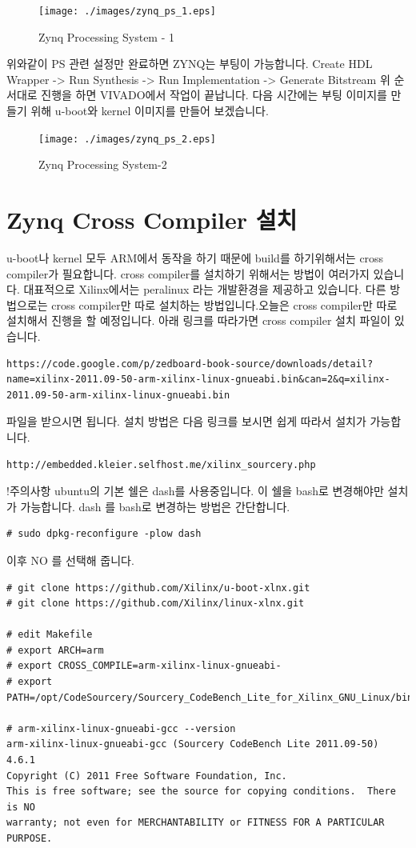 \documentclass[11pt
  , a4paper
  , article
  , oneside
]{memoir}
\begin{document}
\begin{figure}[h!]
	\centering
	\texttt{[image: ./images/zynq\_ps\_1.eps]}
	\caption{Zynq Processing System - 1}
	\label{fig:zynq_ps_1} 
\end{figure}

위와같이 PS 관련 설정만 완료하면 ZYNQ는 부팅이 가능합니다. Create HDL Wrapper -> Run Synthesis -> Run Implementation -> Generate Bitstream 위 순서대로 진행을 하면 VIVADO에서 작업이 끝납니다.
다음 시간에는 부팅 이미지를 만들기 위해 u-boot와 kernel 이미지를 만들어 보겠습니다.

\begin{figure}[h!]
	\centering
	\texttt{[image: ./images/zynq\_ps\_2.eps]}
	\caption{Zynq Processing System-2}
	\label{fig:zynq_ps_2} 
\end{figure}

\section{Zynq Cross Compiler 설치}
u-boot나 kernel 모두 ARM에서 동작을 하기 때문에 build를 하기위해서는 cross compiler가 필요합니다. cross compiler를 설치하기 위해서는 방법이 여러가지 있습니다. 대표적으로 Xilinx에서는 peralinux 라는 개발환경을 제공하고 있습니다. 다른 방법으로는 cross compiler만 따로 설치하는 방법입니다.오늘은 cross compiler만 따로 설치해서 진행을 할 예정입니다.
아래 링크를 따라가면 cross compiler 설치 파일이 있습니다.

\begin{lstlisting}[style=termstyle]
https://code.google.com/p/zedboard-book-source/downloads/detail?name=xilinx-2011.09-50-arm-xilinx-linux-gnueabi.bin&can=2&q=xilinx-2011.09-50-arm-xilinx-linux-gnueabi.bin 
\end{lstlisting}
파일을 받으시면 됩니다.
설치 방법은 다음 링크를 보시면 쉽게 따라서 설치가 가능합니다.
\begin{lstlisting}[style=termstyle]
http://embedded.kleier.selfhost.me/xilinx_sourcery.php
\end{lstlisting}

!주의사항
ubuntu의 기본 쉘은 dash를 사용중입니다. 이 쉘을 bash로 변경해야만 설치가 가능합니다.
dash 를 bash로 변경하는 방법은 간단합니다.
\begin{lstlisting}[style=termstyle]
# sudo dpkg-reconfigure -plow dash
\end{lstlisting}
이후 NO 를 선택해 줍니다.

\begin{lstlisting}[style=termstyle]
# git clone https://github.com/Xilinx/u-boot-xlnx.git
# git clone https://github.com/Xilinx/linux-xlnx.git

# edit Makefile
# export ARCH=arm
# export CROSS_COMPILE=arm-xilinx-linux-gnueabi-
# export PATH=/opt/CodeSourcery/Sourcery_CodeBench_Lite_for_Xilinx_GNU_Linux/bin:$PATH

# arm-xilinx-linux-gnueabi-gcc --version
arm-xilinx-linux-gnueabi-gcc (Sourcery CodeBench Lite 2011.09-50) 4.6.1
Copyright (C) 2011 Free Software Foundation, Inc.
This is free software; see the source for copying conditions.  There is NO
warranty; not even for MERCHANTABILITY or FITNESS FOR A PARTICULAR PURPOSE.
\end{lstlisting}
\end{document}
